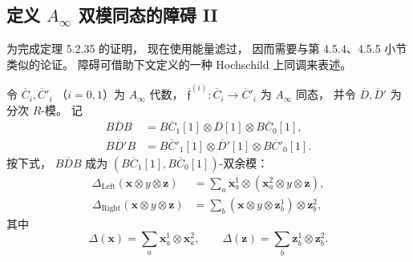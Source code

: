 
\subsection{定义 $A_\infty$ 双模同态的障碍 II}
\label{subsec:5-2-7}

为完成定理 5.2.35 的证明，
现在使用能量滤过，
因而需要与第 4.5.4、4.5.5 小节
类似的论证。
障碍可借助下文定义的一种
Hochschild 上同调来表述。

令 $\overline C_i,\overline C'_i$
（$i=0,1$）为 $A_\infty$ 代数，
$\overline{\mathfrak f}^{(i)}:
\overline C_i\to\overline C'_i$
为 $A_\infty$ 同态，
并令 $\overline D,\overline D'$
为分次 $R$-模。
记
\begin{equation}
\begin{aligned}
B\overline D B
&=B\overline C_1[1]\otimes
\overline D[1]\otimes
B\overline C_0[1],\\
B\overline D'B
&=B\overline C'_1[1]\otimes
\overline D'[1]\otimes
B\overline C'_0[1].
\end{aligned}
\tag{5.2.50}\label{eq:5-2-50}
\end{equation}
按下式，
$B\overline D B$ 成为
$(B\overline C_1[1],
  B\overline C_0[1])$-双余模：
\[
\begin{aligned}
\Delta_{\mathrm{Left}}
(\mathbf x\otimes y\otimes\mathbf z)
&=\sum_a
\mathbf x_a^1\otimes
(\mathbf x_a^2\otimes y\otimes\mathbf z),
\\
\Delta_{\mathrm{Right}}
(\mathbf x\otimes y\otimes\mathbf z)
&=\sum_b
(\mathbf x\otimes y\otimes\mathbf z_b^1)
\otimes\mathbf z_b^2,
\end{aligned}
\]
其中
\begin{equation}
\Delta(\mathbf x)
=\sum_a\mathbf x_a^1\otimes\mathbf x_a^2,
\qquad
\Delta(\mathbf z)
=\sum_b\mathbf z_b^1\otimes\mathbf z_b^2.
\tag{5.2.51}\label{eq:5-2-51}
\end{equation}

